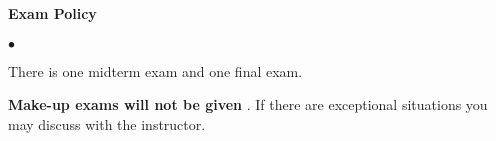 \documentclass[10pt]{article}
\begin{document}
\paragraph*{Exam Policy}

\begin{list}
{$\bullet$}
{\setlength{\itemsep}{-3pt}}


\item There is one midterm exam and one final exam. 
\item \textbf{Make-up exams will not be given }. 
    If there are exceptional situations you may discuss with the instructor.

\end{list}
\end{document}
